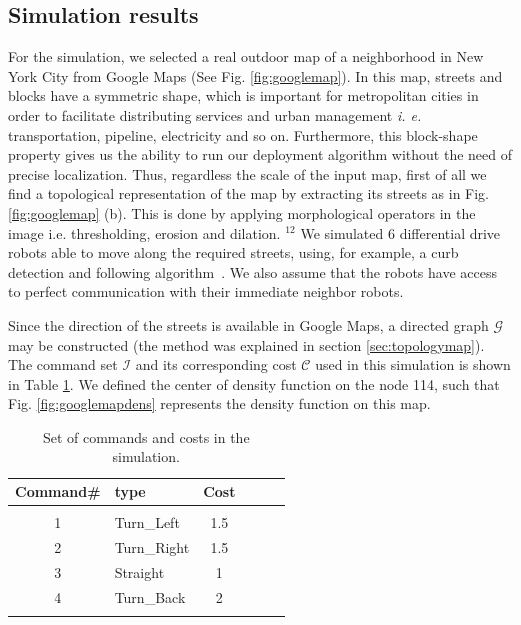 \documentclass[smallcondensed]{svjour3}
\begin{document}
\subsection{Simulation results}
%
For the simulation, we selected a real outdoor map of a neighborhood in New York City from Google Maps (See Fig. \ref{fig:googlemap}). In this map, streets and blocks have a symmetric shape, which is important for metropolitan cities in order to facilitate distributing services and urban management \emph{i. e.} transportation, pipeline, electricity and so on. Furthermore, this block-shape property gives us the ability to run our deployment algorithm without the need of precise localization. Thus, regardless the scale of the input map, first of all we find a topological representation of the map by extracting its streets as in Fig. \ref{fig:googlemap} (b). This is done by applying morphological operators in the image i.e. thresholding, erosion and dilation. {\color{blue}$^{12}$ We simulated 6 differential drive robots able to move along the required streets, using, for example, a curb detection and following algorithm~\cite{Hata14}. We also assume that the robots have access to perfect communication with their immediate neighbor robots.}

%
Since the direction of the streets is available in Google Maps, a directed graph $\mathcal G$ may be constructed (the method was explained in section \ref{sec:topologymap}). The command set $\mathcal{I}$ and its corresponding cost $\mathcal{C}$ used in this simulation is shown in Table \ref{tbl:commandsets}. We defined the center of density function on the node 114, such that Fig.
\ref{fig:googlemapdens} represents the density function on this map.

\begin{table}[t]
\centering
\caption{Set of commands and costs in the simulation.}
\label{tbl:commandsets}
\begin{tabular}{cm{1.5cm}cm{1.9cm}cm{1.8cm}}
Command\#  & type  & Cost    \\
\hline\\
1 & Turn\_Left &  1.5 \\
2 & Turn\_Right& 1.5\\
3 & Straight &  1\\
4 & Turn\_Back & 2\\
\hline\\
\end{tabular}
\end{table}
\end{document}
